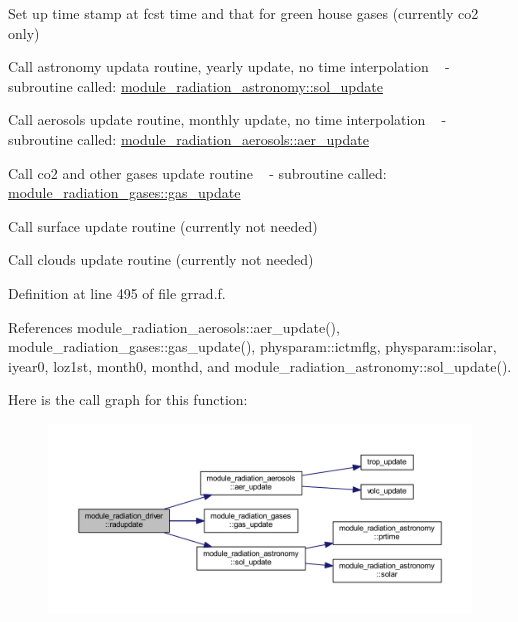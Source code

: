 \begin{DoxyEnumerate}
\item Set up time stamp at fcst time and that for green house gases (currently co2 only)
\item Call astronomy updata routine, yearly update, no time interpolation ~\newline
 -\/ subroutine called\+: \hyperlink{namespacemodule__radiation__astronomy_a7c3585f7355925b360f5bc5d2c25c09e}{module\+\_\+radiation\+\_\+astronomy\+::sol\+\_\+update}
\item Call aerosols update routine, monthly update, no time interpolation ~\newline
 -\/ subroutine called\+: \hyperlink{namespacemodule__radiation__aerosols_a2a91dba33725576c80b4b0f556031707}{module\+\_\+radiation\+\_\+aerosols\+::aer\+\_\+update}
\item Call co2 and other gases update routine ~\newline
 -\/ subroutine called\+: \hyperlink{namespacemodule__radiation__gases_a064db1c287e8614ae7efd6b4fac91a6b}{module\+\_\+radiation\+\_\+gases\+::gas\+\_\+update}
\item Call surface update routine (currently not needed)
\item Call clouds update routine (currently not needed) 
\end{DoxyEnumerate}

Definition at line 495 of file grrad.\+f.



References module\+\_\+radiation\+\_\+aerosols\+::aer\+\_\+update(), module\+\_\+radiation\+\_\+gases\+::gas\+\_\+update(), physparam\+::ictmflg, physparam\+::isolar, iyear0, loz1st, month0, monthd, and module\+\_\+radiation\+\_\+astronomy\+::sol\+\_\+update().



Here is the call graph for this function\+:\nopagebreak
\begin{figure}[H]
\begin{center}
\leavevmode
\includegraphics[width=350pt]{namespacemodule__radiation__driver_a47f0e4defe607fbfc751f6c9274f459a_cgraph}
\end{center}
\end{figure}




